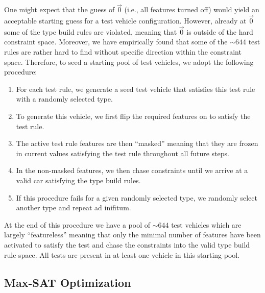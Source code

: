 \documentclass[aps,prl,twocolumn,superscriptaddress,groupedaddress]{revtex4}  %
\begin{document}
One might expect that the guess of $\vec 0$ (i.e., all features turned off)
would yield an acceptable starting guess for a test vehicle configuration.
However, already at $\vec 0$ some of the type build rules are violated, meaning
that $\vec 0$ is outside of the hard constraint space. Moreover, we have
empirically found that some of the $\sim 644$ test rules are rather hard to find
without specific direction within the constraint space. Therefore, to seed a
starting pool of test vehicles, we adopt the following procedure:
\begin{enumerate}
\item For each test rule, we generate a seed test vehicle that satisfies this
test rule with a randomly selected type.
\item To generate this vehicle, we first flip the required features on to
satisfy the test rule. 
\item The active test rule features are then ``masked'' meaning that they are
frozen in current values satisfying the test rule throughout all future steps.
\item In the non-masked features, we then chase constraints until we arrive at a
valid car satisfying the type build rules.
\item If this procedure fails for a given randomly selected type, we randomly
select another type and repeat ad inifitum.
\end{enumerate}
At the end of this procedure we have a pool of $\sim 644$ test vehicles which
are largely ``featureless'' meaning that only the minimal number of features
have been activated to satisfy the test and chase the constraints into the valid
type build rule space. All tests are present in at least one vehicle in this
starting pool.

\subsection{Max-SAT Optimization}
\end{document}
